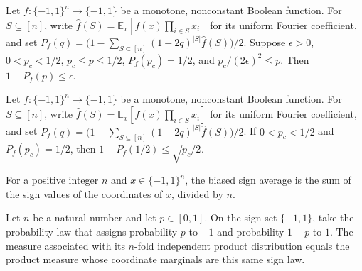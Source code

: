 \begin{theorem}
\label{FABL.one_sub_biasedMinusProbabilityPolynomial_le_epsilon}
\leanok
{}
Let $f:\{-1,1\}^n\to\{-1,1\}$ be a monotone, nonconstant Boolean function. For
$S\subseteq[n]$, write $\widehat f(S)=\mathbb E_x[f(x)\prod_{i\in S}x_i]$ for its
uniform Fourier coefficient, and set
$P_f(q)=\bigl(1-\sum_{S\subseteq[n]}(1-2q)^{|S|}\widehat f(S)\bigr)/2$. Suppose
$\epsilon>0$, $0<p_c<1/2$, $p_c\le p\le1/2$, $P_f(p_c)=1/2$, and
$p_c/(2\epsilon)^2\le p$. Then $1-P_f(p)\le\epsilon$.
\end{theorem}

\begin{theorem}
\label{FABL.one_sub_biasedMinusProbabilityPolynomial_one_half_le_sqrt_critical_div_two}
\leanok
{}
Let $f:\{-1,1\}^n\to\{-1,1\}$ be a monotone, nonconstant Boolean function. For
$S\subseteq[n]$, write $\widehat f(S)=\mathbb E_x[f(x)\prod_{i\in S}x_i]$ for its
uniform Fourier coefficient, and set
$P_f(q)=\bigl(1-\sum_{S\subseteq[n]}(1-2q)^{|S|}\widehat f(S)\bigr)/2$. If
$0<p_c<1/2$ and $P_f(p_c)=1/2$, then $1-P_f(1/2)\le\sqrt{p_c/2}$.
\end{theorem}

\begin{definition}
\label{FABL.biasedSignAverage}
\leanok
{}
For a positive integer $n$ and $x\in\{−1,1\}^n$, the biased sign average is the sum of
the sign values of the coordinates of $x$, divided by $n$.
\end{definition}

\begin{theorem}
\label{FABL.productProbabilityPMF_biasedSign_toMeasure_eq_pi}
\leanok
{}
Let $n$ be a natural number and let $p\in[0,1]$. On the sign set $\{-1,1\}$, take
the probability law that assigns probability $p$ to $-1$ and probability $1-p$ to $1$.
The measure associated with its $n$-fold independent product distribution equals the
product measure whose coordinate marginals are this same sign law.
\end{theorem}

